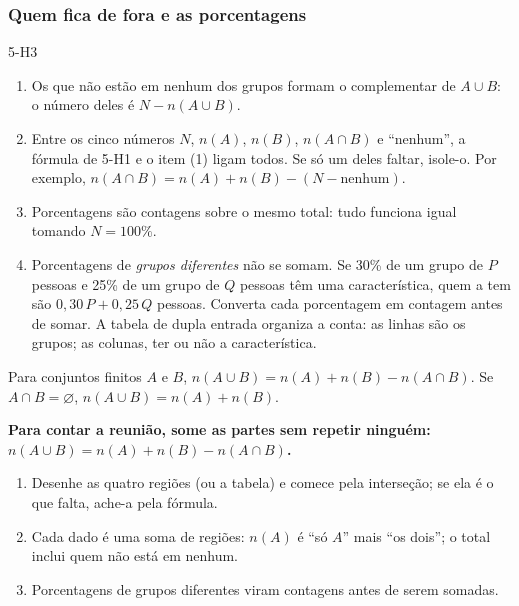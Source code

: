 \subsubsection{Quem fica de fora e as porcentagens}
\begin{construcao}{5-H3}
\begin{enumerate}[label=(\arabic*)]
  \item Os que não estão em nenhum dos grupos formam o complementar de $A\cup B$: o número deles é $N-n(A\cup B)$.
  \item Entre os cinco números $N$, $n(A)$, $n(B)$, $n(A\cap B)$ e \enquote{nenhum}, a fórmula de 5-H1 e o item (1) ligam todos. Se só um deles faltar, isole-o. Por exemplo, $n(A\cap B)=n(A)+n(B)-(N-\text{nenhum})$.
  \item Porcentagens são contagens sobre o mesmo total: tudo funciona igual tomando $N=100\%$.
  \item Porcentagens de \emph{grupos diferentes} não se somam. Se 30\% de um grupo de $P$ pessoas e 25\% de um grupo de $Q$ pessoas têm uma característica, quem a tem são $0{,}30\,P+0{,}25\,Q$ pessoas. Converta cada porcentagem em contagem antes de somar. A tabela de dupla entrada organiza a conta: as linhas são os grupos; as colunas, ter ou não a característica.
\end{enumerate}
\end{construcao}

\begin{definicao}
Para conjuntos finitos $A$ e $B$, $n(A\cup B)=n(A)+n(B)-n(A\cap B)$. Se $A\cap B=\varnothing$, $n(A\cup B)=n(A)+n(B)$.
\end{definicao}

\begin{paralembrar}\label{lembrar-u5}
\textbf{Para contar a reunião, some as partes sem repetir ninguém: $n(A\cup B)=n(A)+n(B)-n(A\cap B)$.}
\begin{enumerate}[label=\arabic*.,leftmargin=1.4em,itemsep=1pt]
  \item Desenhe as quatro regiões (ou a tabela) e comece pela interseção; se ela é o que falta, ache-a pela fórmula.
  \item Cada dado é uma soma de regiões: $n(A)$ é \enquote{só $A$} mais \enquote{os dois}; o total inclui quem não está em nenhum.
  \item Porcentagens de grupos diferentes viram contagens antes de serem somadas.
\end{enumerate}
\end{paralembrar}

